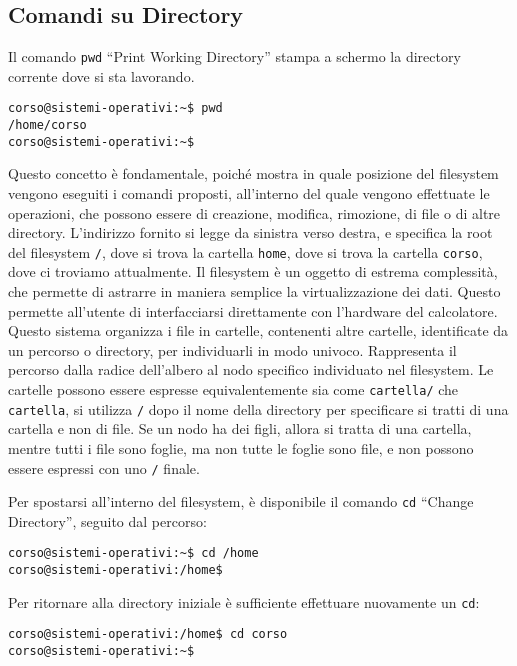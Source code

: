 \documentclass{article}
\numberwithin{equation}{subsection}
\begin{document}
\subsection{Comandi su Directory}

Il comando \verb|pwd| ``Print Working Directory'' stampa a schermo la directory corrente dove si sta lavorando. 
\begin{verbatim}
corso@sistemi-operativi:~$ pwd
/home/corso
corso@sistemi-operativi:~$    
\end{verbatim}

Questo concetto è fondamentale, poiché mostra in quale posizione del filesystem vengono eseguiti i comandi proposti, all'interno del quale vengono effettuate le operazioni, che possono essere di creazione, modifica, 
rimozione, di file o di altre directory. 
L'indirizzo fornito si legge da sinistra verso destra, e specifica la root del filesystem \verb|/|, dove si trova la cartella \verb|home|, dove si trova la cartella \verb|corso|, dove ci troviamo attualmente. 
Il filesystem è un oggetto di estrema complessità, che permette di astrarre in maniera semplice la virtualizzazione dei dati. Questo permette all'utente di interfacciarsi direttamente con l'hardware del calcolatore. 
Questo sistema organizza i file in cartelle, contenenti altre cartelle, identificate da un percorso o directory, per individuarli in modo univoco. Rappresenta il percorso dalla radice dell'albero al nodo specifico 
individuato nel filesystem. Le cartelle possono essere espresse equivalentemente sia come \verb|cartella/| che \verb|cartella|, si utilizza \verb|/| dopo il nome della directory per specificare si tratti di una 
cartella e non di file. Se un nodo ha dei figli, allora si tratta di una cartella, mentre tutti i file sono foglie, ma non tutte le foglie sono file, e non possono essere espressi con uno \verb|/| finale. 


Per spostarsi all'interno del filesystem, è disponibile il comando \verb|cd| ``Change Directory'', seguito dal percorso:
\begin{verbatim}
corso@sistemi-operativi:~$ cd /home
corso@sistemi-operativi:/home$
\end{verbatim}
Per ritornare alla directory iniziale è sufficiente effettuare nuovamente un \verb|cd|:
\begin{verbatim}
corso@sistemi-operativi:/home$ cd corso
corso@sistemi-operativi:~$
\end{verbatim}
    
\end{document}
